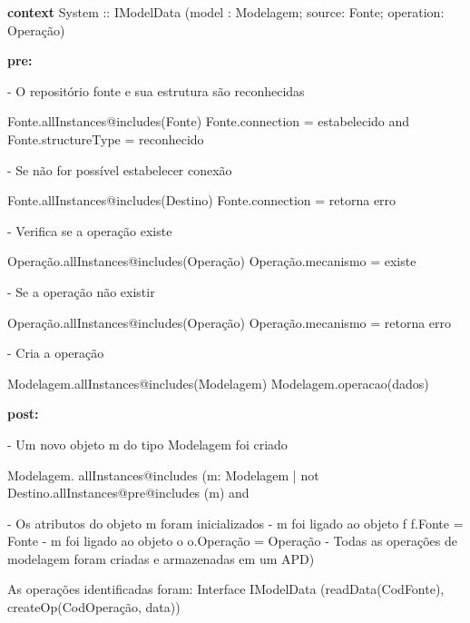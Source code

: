 \begin{minipage}[t][][b]{0.9\textwidth}
	\ttfamily
\hrulefill

\textbf{context} System :: IModelData (model : Modelagem; source: Fonte; operation: Operação)


\textbf{pre:}

- O repositório fonte e sua estrutura são reconhecidas

Fonte.allInstances@includes(Fonte) Fonte.connection = estabelecido 
and  Fonte.structureType = reconhecido

- Se não for possível estabelecer conexão

Fonte.allInstances@includes(Destino) Fonte.connection = retorna  erro

- Verifica se a operação existe

Operação.allInstances@includes(Operação) Operação.mecanismo = existe

- Se a operação não existir

Operação.allInstances@includes(Operação) Operação.mecanismo = retorna erro

- Cria a operação

Modelagem.allInstances@includes(Modelagem) Modelagem.operacao(dados)

\textbf{post:}

- Um novo objeto m do tipo Modelagem foi criado

Modelagem. allInstances@includes (m: Modelagem | not Destino.allInstances@pre@includes (m) and

- Os atributos do objeto m foram inicializados
- m foi ligado ao objeto f
f.Fonte = Fonte
- m foi ligado ao objeto o
o.Operação = Operação
- Todas as operações de modelagem foram criadas e armazenadas em um APD)

\hrulefill

As operações identificadas foram:
Interface IModelData (readData(CodFonte), createOp(CodOperação, data))

\end{minipage}


